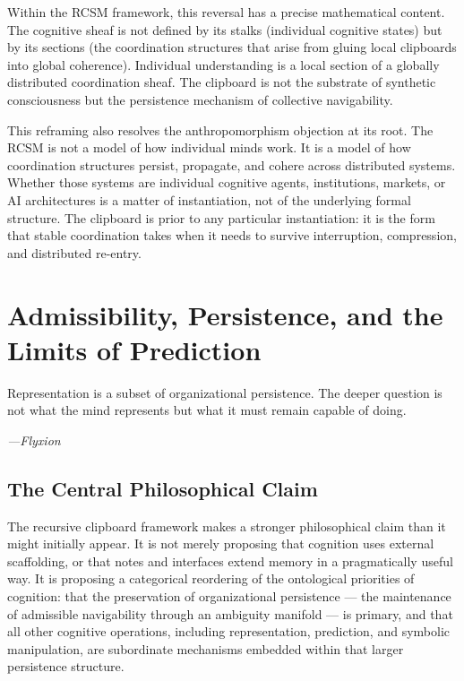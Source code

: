 \documentclass[12pt,oneside]{book}
\theoremstyle{plain}
\theoremstyle{definition}
\theoremstyle{plain}
\begin{document}
Within the RCSM framework, this reversal has a precise mathematical content. The cognitive sheaf is not defined by its stalks (individual cognitive states) but by its sections (the coordination structures that arise from gluing local clipboards into global coherence). Individual understanding is a local section of a globally distributed coordination sheaf. The clipboard is not the substrate of synthetic consciousness but the persistence mechanism of collective navigability.

This reframing also resolves the anthropomorphism objection at its root. The RCSM is not a model of how individual minds work. It is a model of how coordination structures persist, propagate, and cohere across distributed systems. Whether those systems are individual cognitive agents, institutions, markets, or AI architectures is a matter of instantiation, not of the underlying formal structure. The clipboard is prior to any particular instantiation: it is the form that stable coordination takes when it needs to survive interruption, compression, and distributed re-entry.

\chapter{Admissibility, Persistence, and the Limits of Prediction}
\label{ch:admissibility_philosophy}

\epigraph{Representation is a subset of organizational persistence. The deeper question is not what the mind represents but what it must remain capable of doing.}{\textit{---Flyxion}}

\section{The Central Philosophical Claim}

The recursive clipboard framework makes a stronger philosophical claim than it might initially appear. It is not merely proposing that cognition uses external scaffolding, or that notes and interfaces extend memory in a pragmatically useful way. It is proposing a categorical reordering of the ontological priorities of cognition: that the preservation of organizational persistence — the maintenance of admissible navigability through an ambiguity manifold — is primary, and that all other cognitive operations, including representation, prediction, and symbolic manipulation, are subordinate mechanisms embedded within that larger persistence structure.
\end{document}
